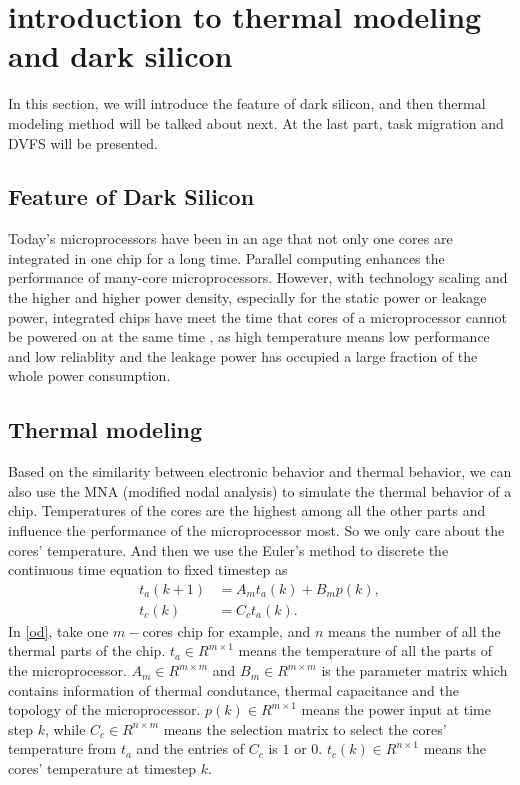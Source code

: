 \section{introduction to thermal modeling and dark silicon }
In this section, we will introduce the feature of dark silicon, and then thermal modeling method will be talked about next. At the last part, task migration and DVFS will be presented.
\subsection{Feature of Dark Silicon} 
  Today's microprocessors have been in an age that not only one cores are integrated in one chip for a long time. Parallel computing enhances the performance of many-core microprocessors. However, with technology scaling and the higher and higher power density, especially for the static power or leakage power, integrated chips have meet the time that cores of a microprocessor cannot be powered on at the same time \cite{MS:DAC'2014}, as high temperature means low performance and low reliablity and the leakage power has occupied a large fraction of the whole power consumption.  



\subsection{Thermal modeling}
Based on the similarity between electronic behavior and thermal behavior, we can also use the MNA (modified nodal analysis) to simulate the thermal behavior of a chip. Temperatures of the cores are the highest among all the other parts and influence the performance of the microprocessor most. So we only care about the cores' temperature.
 And then we use the Euler's method to discrete the continuous time equation to fixed timestep \cite{MaWang:APCCAS'14} as 
\begin{equation}
\begin{split}\label{od}
t_{a}(k+1)&=A_mt_{a}(k)+B_mp(k),\\
t_{c}(k)&=C_{c}t_{a}(k).
\end{split}
\end{equation}
In \eqref{od}, take one $m-$cores chip for example, and $n$ means the number of all the thermal parts of the chip.  $t_{a}\in R^{m\times 1}$ means the temperature of all the parts of the microprocessor. $A_m \in R^{m\times m}$ and $B_m\in R^{m\times m}$ is the parameter matrix which contains information of thermal condutance, thermal capacitance and the topology of the microprocessor. $p(k)\in R^{m\times 1}$ means the power input at time step $k$, while $C_{c} \in R^{n\times m}$ means the selection matrix to select the cores' temperature from $t_{a}$ and the entries of $C_{c}$ is $1$ or $0$. $t_{c}(k)\in R^{n\times 1}$ means the cores' temperature at timestep $k$. 


